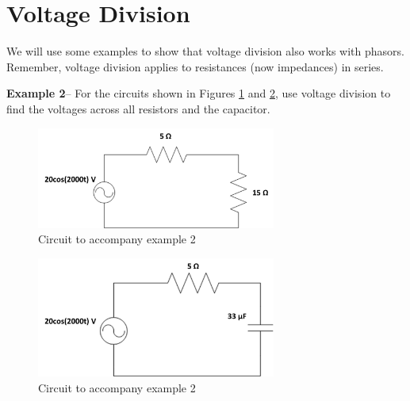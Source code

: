 \documentclass{handout}
\begin{document}
\newpage
\clearpage
\pagebreak
\section{Voltage Division}
We will use some examples to show that voltage division also works with phasors.  Remember, voltage division applies to resistances (now impedances) in series.

\textbf{Example 2}-- For the circuits shown in Figures \ref{fig: Example2a} and \ref{fig: Example2b}, use voltage division to find the voltages across all resistors and the capacitor.

\begin{figure} [h!]
\centering
\includegraphics[width=0.7\textwidth]{Example2a.jpg}
\caption{Circuit to accompany example 2}
\label{fig: Example2a}
\end{figure}
\begin{figure} [h!]
\centering
\includegraphics[width=0.7\textwidth]{Example2b.jpg}
\caption{Circuit to accompany example 2}
\label{fig: Example2b}
\end{figure}
\end{document}
